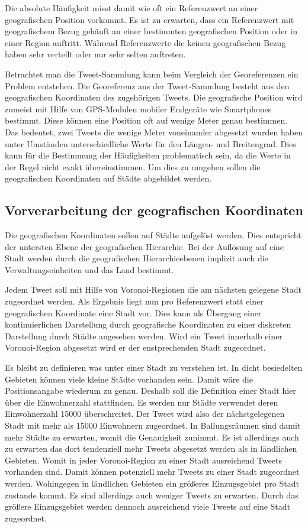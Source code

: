 			Die absolute Häufigkeit misst damit wie oft ein Referenzwert an einer geografischen Position vorkommt.
			Es ist zu erwarten, dass ein Referenzwert mit geografischem Bezug gehäuft an einer bestimmten geografischen Position oder in einer Region auftritt.
			Während Referenzwerte die keinen geografischen Bezug haben sehr verteilt oder nur sehr selten auftreten. 

			Betrachtet man die Tweet-Sammlung kann beim Vergleich der Georeferenzen ein Problem entstehen.
			Die Georeferenz aus der Tweet-Sammlung besteht aus den geografischen Koordinaten des zugehörigen Tweets.
			Die geografische Position wird zumeist mit Hilfe von GPS-Modulen mobiler Endgeräte wie Smartphones bestimmt. 
			Diese können eine Position oft auf wenige Meter genau bestimmen.
			Das bedeutet, zwei Tweets die wenige Meter voneinander abgesetzt wurden haben unter Umständen unterschiedliche Werte für den Längen- und Breitengrad.
			Dies kann für die Bestimmung der Häufigkeiten problematisch sein, da die Werte in der Regel nicht exakt übereinstimmen.
			Um dies zu umgehen sollen die geografischen Koordinaten auf Städte abgebildet werden.

		\subsection{Vorverarbeitung der geografischen Koordinaten}

			Die geografischen Koordinaten sollen auf Städte aufgelöst werden.
			Dies entspricht der untersten Ebene der geografischen Hierarchie.
			Bei der Auflösung auf eine Stadt werden durch die geografischen Hierarchieebenen implizit auch die Verwaltungseinheiten und das Land bestimmt.

			Jedem Tweet soll mit Hilfe von Voronoi-Regionen die am nächsten gelegene Stadt zugeordnet werden.
			Als Ergebnis liegt nun pro Referenzwert statt einer geografischen Koordinate eine Stadt vor.
			Dies kann als Übergang einer kontinuierlichen Darstellung durch geografische Koordinaten zu einer diskreten Darstellung durch Städte angesehen werden. 
			Wird ein Tweet innerhalb einer Voronoi-Region abgesetzt wird er der enstprechenden Stadt zugeordnet.

			Es bleibt zu definieren was unter einer Stadt zu verstehen ist.
			In dicht besiedelten Gebieten können viele kleine Städte vorhanden sein. 
			Damit wäre die Positionsangabe wiederum zu genau.
			Deshalb soll die Definition einer Stadt hier über die Einwohnerzahl stattfinden.
			Es werden nur Städte verwendet deren Einwohnerzahl 15000 überschreitet.
			Der Tweet wird also der nächstgelegenen Stadt mit mehr als 15000 Einwohnern zugeordnet.
			In Ballungsräumen sind damit mehr Städte zu erwarten, womit die Genauigkeit zunimmt.
			Es ist allerdings auch zu erwarten das dort tendenziell mehr Tweets abgesetzt werden als in ländlichen Gebieten.
			Womit in jeder Voronoi-Region zu einer Stadt ausreichend Tweets vorhanden sind.
			Damit können potenziell mehr Tweets zu einer Stadt zugeordnet werden.
			Wohingegen in ländlichen Gebieten ein größeres Einzugsgebiet pro Stadt zustande kommt.
			Es sind allerdings auch weniger Tweets zu erwarten. 
			Durch das größere Einzugsgebiet werden dennoch ausreichend viele Tweets auf eine Stadt zugeordnet. 

